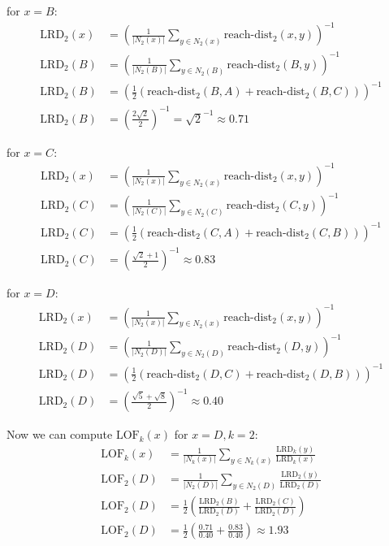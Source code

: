\documentclass{article}
\begin{document}
for $x=B$:
\begin{align*}
\text{LRD}_2(x) &= \left( \frac{1}{|N_2(x)|} \sum_{y \in N_2(x)} \text{reach-dist}_2(x,y) \right)^{-1} \\
\text{LRD}_2(B) &= \left( \frac{1}{|N_2(B)|} \sum_{y \in N_2(B)} \text{reach-dist}_2(B,y) \right)^{-1} \\
\text{LRD}_2(B) &= \left( \frac{1}{2} (\text{reach-dist}_2(B,A) + \text{reach-dist}_2(B,C))  \right)^{-1} \\
\text{LRD}_2(B) &= \left( \frac{2 \sqrt{2}}{2} \right)^{-1} = \sqrt{2}^{-1} \approx 0.71
\end{align*}

for $x=C$:
\begin{align*}
\text{LRD}_2(x) &= \left( \frac{1}{|N_2(x)|} \sum_{y \in N_2(x)} \text{reach-dist}_2(x,y) \right)^{-1}\\
\text{LRD}_2(C) &= \left( \frac{1}{|N_2(C)|} \sum_{y \in N_2(C)} \text{reach-dist}_2(C,y) \right)^{-1}\\
\text{LRD}_2(C) &= \left( \frac{1}{2} (\text{reach-dist}_2(C,A) + \text{reach-dist}_2(C,B)) \right)^{-1}\\
\text{LRD}_2(C) &= \left( \frac{\sqrt{2} + 1}{2} \right)^{-1} \approx 0.83
\end{align*}


for $x=D$:
\begin{align*}
\text{LRD}_2(x) &= \left( \frac{1}{|N_2(x)|} \sum_{y \in N_2(x)} \text{reach-dist}_2(x,y) \right)^{-1} \\
\text{LRD}_2(D) &= \left( \frac{1}{|N_2(D)|} \sum_{y \in N_2(D)} \text{reach-dist}_2(D,y) \right)^{-1} \\
\text{LRD}_2(D) &= \left( \frac{1}{2} \left(\text{reach-dist}_2(D,C) + \text{reach-dist}_2(D,B)\right)  \right)^{-1} \\
\text{LRD}_2(D) &= \left( \frac{\sqrt{5} + \sqrt{8}}{2}\right)^{-1} \approx 0.40
\end{align*}

Now we can compute $\text{LOF}_k(x)$ for $x=D, k=2$:
\begin{align*}
\text{LOF}_k(x) &= \frac{1}{|N_k(x)|} \sum_{y \in N_k(x)} \frac{\text{LRD}_k(y)}{\text{LRD}_k(x)} \\
\text{LOF}_2(D) &= \frac{1}{|N_2(D)|} \sum_{y \in N_2(D)} \frac{\text{LRD}_2(y)}{\text{LRD}_2(D)} \\
\text{LOF}_2(D) &= \frac{1}{2} \left(\frac{\text{LRD}_2(B)}{\text{LRD}_2(D)}  + \frac{\text{LRD}_2(C)}{\text{LRD}_2(D)} \right) \\
\text{LOF}_2(D) &= \frac{1}{2} \left(\frac{0.71}{0.40}  + \frac{0.83}{0.40} \right) \approx 1.93
\end{align*}
\end{document}
